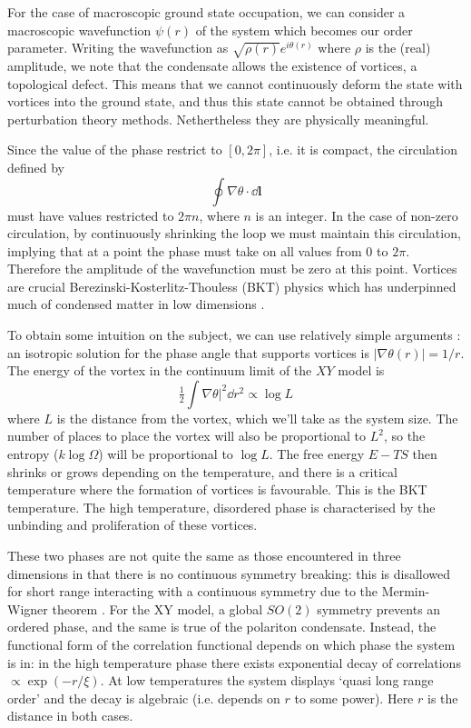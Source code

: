 \documentclass[letterpaper, 10 pt, conference]{IEEEtran}  %
\newcommand{\myvec}[1]{\boldsymbol{#1}}
\begin{document}
For the case of macroscopic ground state occupation, we can consider a macroscopic wavefunction $\psi(r)$ of the system which becomes our order parameter. 
Writing the wavefunction as $\sqrt{\rho(r)} e^{i \theta (r)}$ where $\rho$ is the (real) amplitude, we note that the condensate allows the existence of vortices, a topological defect.
This means that we cannot continuously deform the state with vortices into the ground state, and thus this state cannot be obtained through perturbation theory methods.
Nethertheless they are physically meaningful.  

Since the value of the phase restrict to $[0, 2 \pi]$, i.e. it is compact, the circulation defined by 
\[
\oint \nabla \theta \cdot \dd{\myvec{l}} 
\]
must have values restricted to $2\pi n$, where $n$ is an integer. 
In the case of non-zero circulation, by continuously shrinking the loop we must maintain this circulation, implying that at a point the phase must take on all values from 0 to $2\pi$. 
Therefore the amplitude of the wavefunction must be zero at this point.
Vortices are crucial Berezinski-Kosterlitz-Thouless (BKT) physics which has underpinned much of condensed matter in low dimensions \cite{jose201340}. 

To obtain some intuition on the subject, we can use relatively simple arguments \cite{altland2010condensed}: an isotropic solution for the phase angle that supports vortices is $|\nabla \theta(r)| =1/r$. 
The energy of the vortex in the continuum limit of the $XY$ model is
\[
\tfrac12 \int \nabla \theta |^2 \dd r^2 \propto \log L
\]
where $L$ is the distance from the vortex, which we'll take as the system size. 
The number of places to place the vortex will also be proportional to $L^2$, so the entropy ($k \log \Omega$) will be proportional to $\log L$. 
The free energy $E - TS$ then shrinks or grows depending on the temperature, and there is a critical temperature where the formation of vortices is favourable. 
This is the BKT temperature.
The high temperature, disordered phase is characterised by the unbinding and proliferation of these vortices.
 
These two phases are not quite the same as those encountered in three dimensions in that there is no continuous symmetry breaking: this is disallowed for short range interacting with a continuous symmetry due to the Mermin-Wigner theorem \cite{Coleman1973}. 
For the XY model, a global $SO(2)$ symmetry prevents an ordered phase, and the same is true of the polariton condensate. 
Instead, the functional form of the correlation functional depends on which phase the system is in: in the high temperature phase there exists exponential decay of correlations $\propto \exp (-r / \xi)$. 
At low temperatures the system displays `quasi long range order' and the decay is algebraic (i.e. depends on $r$ to some power).
Here $r$ is the distance in both cases. 
 
\end{document}
